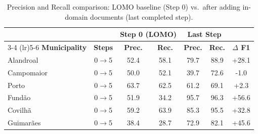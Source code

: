 \begin{table}[t]
\centering
\caption{Precision and Recall comparison: LOMO baseline (Step 0) vs.\ after adding in-domain documents (last completed step).}
\label{tab:incremental_pr}
\small
\begin{tabular}{l c cc cc c}
\toprule
 & & \multicolumn{2}{c}{\textbf{Step 0 (LOMO)}} & \multicolumn{2}{c}{\textbf{Last Step}} & \\
\cmidrule(lr){3-4} \cmidrule(lr){5-6}
\textbf{Municipality} & \textbf{Steps} & \textbf{Prec.} & \textbf{Rec.} & \textbf{Prec.} & \textbf{Rec.} & \textbf{$\Delta$ F1} \\
\midrule
Alandroal & 0$\to$5 & 52.4 & 58.1 & 79.7 & 88.9 & +28.1 \\
Campomaior & 0$\to$5 & 50.0 & 52.1 & 39.7 & 72.6 & -1.0 \\
Porto & 0$\to$5 & 63.7 & 62.5 & 61.2 & 69.1 & +2.3 \\
Fundão & 0$\to$5 & 51.9 & 34.2 & 95.7 & 96.3 & +56.6 \\
Covilhã & 0$\to$5 & 59.2 & 63.9 & 85.3 & 95.5 & +32.8 \\
Guimarães & 0$\to$5 & 38.4 & 28.7 & 72.9 & 82.1 & +45.6 \\
\bottomrule
\end{tabular}
\end{table}